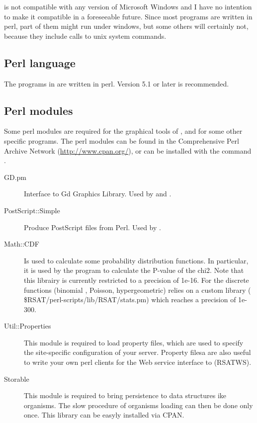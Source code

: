\documentclass{book}
\begin{document}
\RSAT is not compatible with any version of Microsoft Windows and I
have no intention to make it compatible in a foreseeable future. Since
most programs are written in perl, part of them might run under
windows, but some others will certainly not, because they include
calls to unix system commands.

\subsection{Perl language}

The programs in \RSAT are written in perl. Version 5.1 or
later is recommended.

\subsection{Perl modules}

Some perl modules are required for the graphical tools of \RSAT, and
for some other specific programs. The perl modules can be found in the
Comprehensive Perl Archive Network (\url{http://www.cpan.org/}), or
can be installed with the command .

\begin{description}
\item[GD.pm] Interface to Gd Graphics Library. Used by
   and .

\item[PostScript::Simple] Produce PostScript files from Perl. Used by
  .

\item[Math::CDF] Is used to calculate some probability distribution
  functions. In particular, it is used by the program
   to calculate the P-value of the
  chi2. Note that this librairy is currently restricted to a precision
  of 1e-16. For the discrete functions (binomial , Poisson,
  hypergeometric) \RSAT relies on a custom library (
  \$RSAT/perl-scripts/lib/RSAT/stats.pm) which reaches a precision of
  1e-300.

\item[Util::Properties] This module is required to load property
  files, which are used to specify the site-specific configuration of
  your \RSAT server. Property filesa are also useful to write your own
  perl clients for the Web service interface to \RSAT (RSATWS).

\item[Storable] This module is required to bring persistence to data
  structures ike organisms. The slow procedure of organisms loading
  can then be done only once. This library can be easyly installed via
  CPAN.

\end{description}
\end{document}
